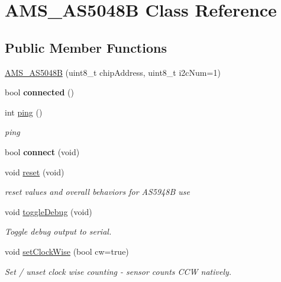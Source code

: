 \hypertarget{classAMS__AS5048B}{}\section{A\+M\+S\+\_\+\+A\+S5048B Class Reference}
\label{classAMS__AS5048B}
\subsection*{Public Member Functions}
\begin{DoxyCompactItemize}
\item 
\hyperlink{classAMS__AS5048B_af3749e3b6d8b1a4eb755f56581aeacdc}{A\+M\+S\+\_\+\+A\+S5048B} (uint8\+\_\+t chip\+Address, uint8\+\_\+t i2c\+Num=1)
\item 
\mbox{\label{classAMS__AS5048B_aa91e8e7c01a605f3bbe99404731e4eb9}} 
bool {\bfseries connected} ()
\item 
int \hyperlink{classAMS__AS5048B_a7c80b5daeb18595c1a0e7b5a9d44b4e8}{ping} ()
\begin{DoxyCompactList}\small\item\em ping \end{DoxyCompactList}\item 
\mbox{\label{classAMS__AS5048B_ac1954845f9e735e995474e6de02d7e51}} 
bool {\bfseries connect} (void)
\item 
void \hyperlink{classAMS__AS5048B_a7f2a933875b46cf63eb29137c63dd11f}{reset} (void)
\begin{DoxyCompactList}\small\item\em reset values and overall behaviors for A\+S5948B use \end{DoxyCompactList}\item 
void \hyperlink{classAMS__AS5048B_ac2485a851c68e9a5b410c47ffc3485ca}{toggle\+Debug} (void)
\begin{DoxyCompactList}\small\item\em Toggle debug output to serial. \end{DoxyCompactList}\item 
void \hyperlink{classAMS__AS5048B_a7f80205c1b980e90a13482c72711e62d}{set\+Clock\+Wise} (bool cw=true)
\begin{DoxyCompactList}\small\item\em Set / unset clock wise counting -\/ sensor counts C\+CW natively. \end{DoxyCompactList}\item 

\end{DoxyCompactItemize}
